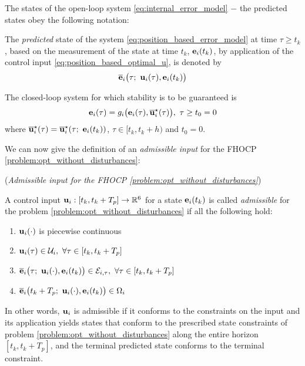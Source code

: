 The states of the open-loop system \eqref{eq:internal_error_model} $-$ the
predicted states obey the following notation:
\begin{bw_box}
\begin{remark}
The \textit{predicted} state of the system \eqref{eq:position_based_error_model}
at time $\tau \geq t_k$ , based on the measurement of the state at time
$t_k$, $\bm{\mathbf{e}}_i(t_k)$, by application of the control input
\eqref{eq:position_based_optimal_u}, is denoted by
\begin{align}
  \overline{\bm{\mathbf{e}}}_i\big(\tau;\ \bm{\mathbf{u}}_i(\tau), \bm{\mathbf{e}}_i(t_k)\big) \label{eq:position_based_predicted_error_0}
\end{align}
\end{remark}
\end{bw_box}

The closed-loop system for which stability is to be guaranteed is
\begin{align}
  \bm{\mathbf{e}}_i(\tau) = g_i\big(\bm{\mathbf{e}}_i(\tau), \overline{\bm{\mathbf{u}}}_i^{\star}(\tau)\big),\ \tau \geq t_0 = 0
  \label{eq:without_disturbances_closed_loop}
\end{align}
where $\overline{\bm{\mathbf{u}}}_i^{\star}(\tau) = \overline{\bm{\mathbf{u}}}_i^{\star}(\tau;\ \bm{\mathbf{e}}_i(t_k))$,
$\tau \in [t_k, t_k + h)$ and $t_0 = 0$.


We can now give the definition of an \textit{admissible input} for the FHOCP
\eqref{problem:opt_without_disturbances}:

\begin{bw_box}
  \begin{definition} (\textit{Admissible input for the FHOCP
\eqref{problem:opt_without_disturbances}})
  \label{definition:admissible_input}

  A control input $\bm{\mathbf{u}}_i : [t_k, t_k + T_p] \to \mathbb{R}^6$ for a state
  $\bm{\mathbf{e}}_i(t_k)$ is called \textit{admissible} for the problem
  \eqref{problem:opt_without_disturbances} if all the following hold:

  \begin{enumerate}
    \item $\bm{\mathbf{u}}_i(\cdot)$ is piecewise continuous
    \item $\vect{u}_i(\tau) \in \mathcal{U}_i,\ \forall \tau \in [t_k, t_k + T_p]$
    \item $\overline{\vect{e}}_i\big(\tau;\ \vect{u}_i(\cdot), \vect{e}_i(t_k)\big) \in \mathcal{E}_{i,\tau},\ \forall \tau \in [t_k, t_k + T_p]$
    \item $\overline{\vect{e}}_i\big(t_k + T_p;\ \vect{u}_i(\cdot), \vect{e}_i(t_k)\big) \in \Omega_i$
  \end{enumerate}

  In other words, $\bm{\mathbf{u}}_i$ is admissible if it conforms to the constraints
  on the input and its application yields states that conform to the
  prescribed state constraints of problem
  \eqref{problem:opt_without_disturbances} along the entire horizon
  $[t_k, t_k + T_p]$, and the terminal predicted state conforms to the
  terminal constraint.

\end{definition}
\end{bw_box}
